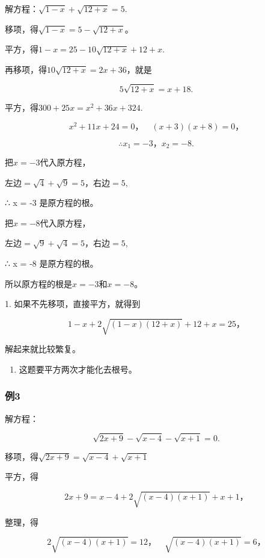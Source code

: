 解方程：\(\sqrt{1-x}+\sqrt{12+x}=5.\)

 移项，得\(\sqrt{1 - x} = 5 - \sqrt{12 + x}\)。

平方，得\(1 - x = 25 - 10\sqrt{12 + x} + 12 + x.\)

再移项，得\(10\sqrt{12 + x} = 2x + 36\)，就是

\[
5 \sqrt {12 + x} = x + 18.
\]

平方，得\(300 + 25x = x^2 + 36x + 324.\)

\[
x ^ {2} + 11 x + 24 = 0\text{，} \quad (x + 3) (x + 8) = 0\text{，}
\]

\[
\therefore x _ {1} = - 3\text{，} x _ {2} = - 8.
\]

 把\(x = -3\)代入原方程，

左边\(= \sqrt{4} +\sqrt{9} = 5\)，右边\(= 5,\)

∴ x = -3 是原方程的根。

把\(x = -8\)代入原方程，

左边\(= \sqrt{9} +\sqrt{4} = 5\)，右边\(= 5,\)

∴ x = -8 是原方程的根。

所以原方程的根是\(x = -3\)和\(x = -8\)。

 1. 如果不先移项，直接平方，就得到

\[
1 - x + 2 \sqrt {(1 - x) (12 + x)} + 12 + x = 25\text{，}
\]

解起来就比较繁复。

\begin{enumerate}[start=2]
\item
  这题要平方两次才能化去根号。
\end{enumerate}

\subsubsection{例3}

解方程：

\[
\sqrt {2 x + 9} - \sqrt {x - 4} - \sqrt {x + 1} = 0.
\]

 移项，得\(\sqrt{2x + 9} = \sqrt{x - 4} +\sqrt{x + 1}\)

平方，得

\[
2 x + 9 = x - 4 + 2 \sqrt {(x - 4) (x + 1)} + x + 1\text{，}
\]

整理，得

\[
2 \sqrt {(x - 4) (x + 1)} = 12\text{，} \quad \sqrt {(x - 4) (x + 1)} = 6\text{，}
\]

